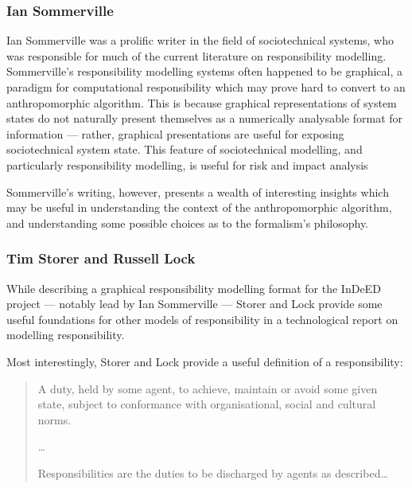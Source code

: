 \subsubsection{Ian Sommerville}
Ian Sommerville was a prolific writer in the field of sociotechnical systems, who was responsible for much of the current literature on responsibility modelling\cite{sommerville_graphical_responsibility,sommerville_dependable_systems_chap_8,sommerville_dependable_systems_chapter_9}. Sommerville's responsibility modelling systems often happened to be graphical\cite{sommerville_graphical_responsibility}, a paradigm for computational responsibility which may prove hard to convert to an anthropomorphic algorithm. This is because graphical representations of system states do not naturally present themselves as a numerically analysable format for information --- rather, graphical presentations are useful for exposing sociotechnical system state. This feature of sociotechnical modelling, and particularly responsibility modelling, is useful for risk and impact analysis\cite{ObashiMethodology}

Sommerville's writing, however, presents a wealth of interesting insights which may be useful in understanding the context of the anthropomorphic algorithm, and understanding some possible choices as to the formalism's philosophy.\par


\subsubsection{Tim Storer and Russell Lock}
While describing a graphical responsibility modelling format for the InDeED project --- notably lead by Ian Sommerville --- Storer and Lock provide some useful foundations for other models of responsibility in a technological report on modelling responsibility\cite{storer2008modelling}.\par

Most interestingly, Storer and Lock provide a useful definition of a responsibility:

\begin{quotation}
    A duty, held by some agent, to achieve, maintain or avoid some given state, subject to conformance with organisational, social and cultural norms.\cite{storer2008modelling}\par
    
    \ldots{}\par
    
    Responsibilities are the duties to be discharged by agents as described\ldots{}
\end{quotation}

